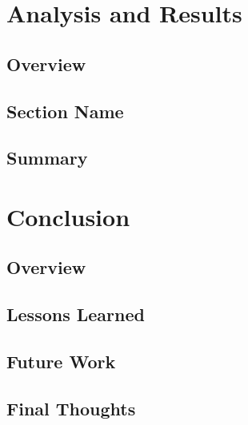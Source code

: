\documentclass[12pt,letterpaper,oneside]{book}
\begin{document}
    \chapter{Analysis and Results}
    \label{analysis}
    	\section{Overview}
        \label{subanalysis}
        

    	\section{Section Name}
        \label{sectionname}
        
        
        \section{Summary}
        \label{Ch4Sum}
   		
        
    \chapter{Conclusion}
    \label{conclusion}
        \section{Overview}
        \label{conclusionoverview}
        
    	
    	\section{Lessons Learned}
        \label{LessonsLearned}
        
        
        \section{Future Work}
        \label{FutureWork}
        
        
        \section{Final Thoughts}
        \label{finalthoughts}
        
        
    \appendix
     	
\backmatter
	\singlespace
    
    
    \clearpage

    
\end{document}
